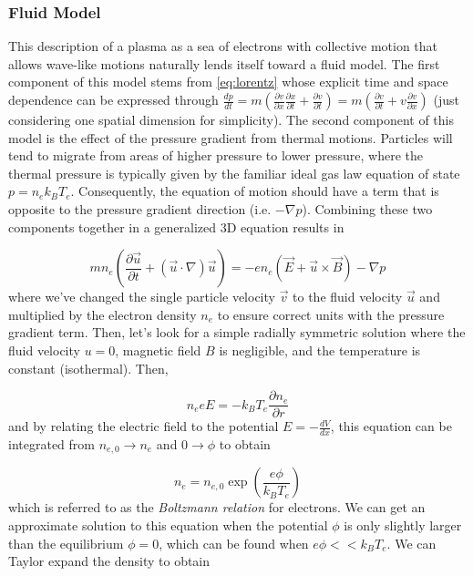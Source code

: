 \subsubsection{Fluid Model}
This description of a plasma as a sea of electrons with collective motion that allows wave-like motions naturally lends itself toward a fluid model. The first component of this model stems from \cref{eq:lorentz} whose explicit time and space dependence can be expressed through $\frac{d p}{d t} = m (\frac{\partial v}{\partial x} \frac{\partial x}{\partial t} + \frac{\partial v}{\partial t}) = m (\frac{\partial v}{\partial t} + v \frac{\partial v}{\partial x})$ (just considering one spatial dimension for simplicity). The second component of this model is the effect of the pressure gradient from thermal motions. Particles will tend to migrate from areas of higher pressure to lower pressure, where the thermal pressure is typically given by the familiar ideal gas law equation of state $p = n_e k_B T_e$. Consequently, the equation of motion should have a term that is opposite to the pressure gradient direction (i.e. $- \nabla p$). Combining these two components together in a generalized 3D equation results in

\begin{equation}
	m n_e (\frac{\partial \vec{u}}{\partial t} + (\vec{u} \cdot \nabla) \vec{u}) = -e n_e (\vec{E} + \vec{u} \times \vec{B}) - \nabla p \label{eq:fluid}
\end{equation}
where we've changed the single particle velocity $\vec{v}$ to the fluid velocity $\vec{u}$ and multiplied by the electron density $n_e$ to ensure correct units with the pressure gradient term. Then, let's look for a simple radially symmetric solution where the fluid velocity $u = 0$, magnetic field $B$ is negligible, and the temperature is constant (isothermal). Then, 

\begin{equation}
	n_e e E = - k_B T_e \frac{\partial n_e}{\partial r}
\end{equation}
and by relating the electric field to the potential $E = - \frac{dV}{dx}$, this equation can be integrated from $n_{e,0} \rightarrow n_e$ and $0 \rightarrow \phi$ to obtain 

\begin{equation}
	n_e = n_{e,0} \exp(\frac{e \phi}{k_B T_e}) \label{eq:boltzmann}
\end{equation}
which is referred to as the \emph{Boltzmann relation} for electrons\cite{Chen_2015_Plasma}. We can get an approximate solution to this equation when the potential $\phi$ is only slightly larger than the equilibrium $\phi=0$, which can be found when $e \phi << k_B T_e$. We can Taylor expand the density to obtain 

